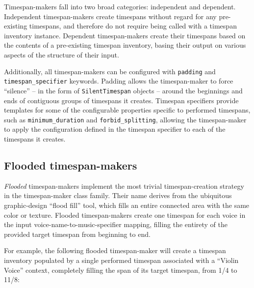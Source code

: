 Timespan-makers fall into two broad categories: independent and dependent.
Independent timespan-makers create timespans without regard for any
pre-existing timespans, and therefore do not require being called with a
timespan inventory instance. Dependent timespan-makers create their timespans
based on the contents of a pre-existing timespan inventory, basing their output
on various aspects of the structure of their input.

Additionally, all timespan-makers can be configured with \texttt{padding} and
\texttt{timespan\_specifier} keywords. Padding allows the timespan-maker to
force \enquote{silence} -- in the form of \texttt{SilentTimespan} objects --
around the beginnings and ends of contiguous groups of timespans it creates.
Timespan specifiers provide templates for some of the configurable properties
specific to performed timespans, such as \texttt{minimum\_duration} and
\texttt{forbid\_splitting}, allowing the timespan-maker to apply the
configuration defined in the timespan specifier to each of the timespans it
creates.

\subsection{Flooded timespan-makers} %


\emph{Flooded} timespan-makers implement the most trivial timespan-creation strategy
in the timespan-maker class family. Their name derives from the ubiquitous
graphic-design \enquote{flood fill} tool, which fills an entire connected area
with the same color or texture. Flooded timespan-makers create one timespan for
each voice in the input voice-name-to-music-specifier mapping, filling the
entirety of the provided target timespan from beginning to end.

For example, the following flooded timespan-maker will create a timespan
inventory populated by a single performed timespan associated with a
\enquote{Violin Voice} context, completely filling the span of its target
timespan, from 1/4 to 11/8:

\begin{comment}
<abjad>
music_specifiers = {'Violin Voice': 'violin music'}
target_timespan = timespantools.Timespan((1, 4), (11, 8))
flooded_timespan_maker = consort.FloodedTimespanMaker()
timespan_inventory = flooded_timespan_maker(
    music_specifiers=music_specifiers,
    target_timespan=target_timespan,
    )
print(format(timespan_inventory))
</abjad>
\end{comment}

